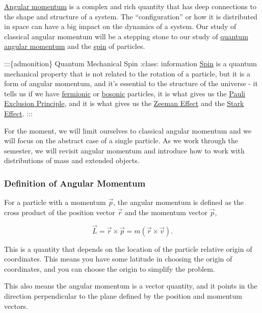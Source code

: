\documentclass[11pt]{article}
\begin{document}
\href{https://en.wikipedia.org/wiki/Angular_momentum}{Angular momentum}
is a complex and rich quantity that has deep connections to the shape
and structure of a system. The ``configuration'' or how it is
distributed in space can have a big impact on the dynamics of a system.
Our study of classical angular momentum will be a stepping stone to our
study of
\href{https://en.wikipedia.org/wiki/Angular_momentum_operator}{quantum
angular momentum} and the
\href{\%5Bhttps://en.wikipedia.org/wiki/Spin_(physics)\%5D}{spin} of
particles.

:::\{admonition\} Quantum Mechanical Spin :class: information
\href{https://en.wikipedia.org/wiki/Spin_(physics)}{Spin} is a quantum
mechanical property that is not related to the rotation of a particle,
but it is a form of angular momentum, and it's essential to the
structure of the universe - it tells us if we have
\href{https://en.wikipedia.org/wiki/Fermion}{fermionic} or
\href{https://en.wikipedia.org/wiki/Boson}{bosonic} particles, it is
what gives us the
\href{https://en.wikipedia.org/wiki/Pauli_exclusion_principle}{Pauli
Exclusion Principle}, and it is what gives us the
\href{https://en.wikipedia.org/wiki/Zeeman_effect}{Zeeman Effect} and
the \href{https://en.wikipedia.org/wiki/Stark_effect}{Stark Effect}. :::

    For the moment, we will limit ourselves to classical angular momentum
and we will focus on the abstract case of a single particle. As we work
through the semester, we will revisit angular momentum and introduce how
to work with distributions of mass and extended objects.

    \subsubsection{Definition of Angular
Momentum}\label{definition-of-angular-momentum}

For a particle with a momentum \(\vec{p}\), the angular momentum is
defined as the cross product of the position vector \(\vec{r}\) and the
momentum vector \(\vec{p}\),

\[\vec{L} = \vec{r} \times \vec{p} = m \left(\vec{r} \times \vec{v}\right).\]

This is a quantity that depends on the location of the particle relative
origin of coordinates. This means you have some latitude in choosing the
origin of coordinates, and you can choose the origin to simplify the
problem.

This also means the angular momentum is a vector quantity, and it points
in the direction perpendicular to the plane defined by the position and
momentum vectors.
\end{document}

